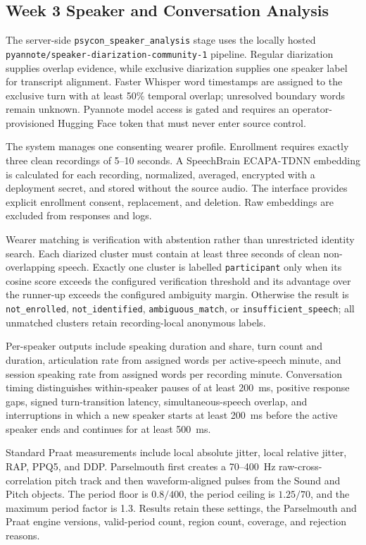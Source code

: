 \subsection{Week 3 Speaker and Conversation Analysis}
\label{sec:week3-speaker-analysis}

The server-side \texttt{psycon\_speaker\_analysis} stage uses the locally hosted \nolinkurl{pyannote/speaker-diarization-community-1} pipeline. Regular diarization supplies overlap evidence, while exclusive diarization supplies one speaker label for transcript alignment. Faster Whisper word timestamps are assigned to the exclusive turn with at least 50\% temporal overlap; unresolved boundary words remain unknown. Pyannote model access is gated and requires an operator-provisioned Hugging Face token that must never enter source control.

The system manages one consenting wearer profile. Enrollment requires exactly three clean recordings of 5--10 seconds. A SpeechBrain ECAPA-TDNN embedding is calculated for each recording, normalized, averaged, encrypted with a deployment secret, and stored without the source audio. The interface provides explicit enrollment consent, replacement, and deletion. Raw embeddings are excluded from responses and logs.

Wearer matching is verification with abstention rather than unrestricted identity search. Each diarized cluster must contain at least three seconds of clean non-overlapping speech. Exactly one cluster is labelled \texttt{participant} only when its cosine score exceeds the configured verification threshold and its advantage over the runner-up exceeds the configured ambiguity margin. Otherwise the result is \texttt{not\_enrolled}, \texttt{not\_identified}, \texttt{ambiguous\_match}, or \texttt{insufficient\_speech}; all unmatched clusters retain recording-local anonymous labels.

Per-speaker outputs include speaking duration and share, turn count and duration, articulation rate from assigned words per active-speech minute, and session speaking rate from assigned words per recording minute. Conversation timing distinguishes within-speaker pauses of at least 200~ms, positive response gaps, signed turn-transition latency, simultaneous-speech overlap, and interruptions in which a new speaker starts at least 200~ms before the active speaker ends and continues for at least 500~ms.

Standard Praat measurements include local absolute jitter, local relative jitter, RAP, PPQ5, and DDP. Parselmouth first creates a 70--400~Hz raw-cross-correlation pitch track and then waveform-aligned pulses from the Sound and Pitch objects. The period floor is $0.8/400$, the period ceiling is $1.25/70$, and the maximum period factor is 1.3. Results retain these settings, the Parselmouth and Praat engine versions, valid-period count, region count, coverage, and rejection reasons.

